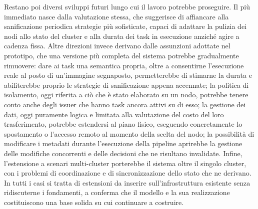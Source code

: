 Restano poi diversi sviluppi futuri lungo cui il lavoro potrebbe proseguire. Il più immediato nasce dalla valutazione stessa, che suggerisce di affiancare alla sanificazione periodica strategie più sofisticate, capaci di adattare la pulizia dei nodi allo stato del cluster e alla durata dei task in esecuzione anziché agire a cadenza fissa. Altre direzioni invece derivano dalle assunzioni adottate nel prototipo, che una versione più completa del sistema potrebbe gradualmente rimuovere: dare ai task una semantica propria, oltre a consentirne l'esecuzione reale al posto di un'immagine segnaposto, permetterebbe di stimarne la durata e abiliterebbe proprio le strategie di sanificazione appena accennate; la politica di isolamento, oggi riferita a ciò che è stato elaborato su un nodo, potrebbe tenere conto anche degli issuer che hanno task ancora attivi su di esso; la gestione dei dati, oggi puramente logica e limitata alla valutazione del costo del loro trasferimento, potrebbe estendersi al piano fisico, eseguendo concretamente lo spostamento o l'accesso remoto al momento della scelta del nodo; la possibilità di modificare i metadati durante l'esecuzione della pipeline aprirebbe la gestione delle modifiche concorrenti e delle decisioni che ne risultano invalidate. Infine, l'estensione a scenari multi-cluster porterebbe il sistema oltre il singolo cluster, con i problemi di coordinazione e di sincronizzazione dello stato che ne derivano. In tutti i casi si tratta di estensioni da inserire sull'infrastruttura esistente senza ridiscuterne i fondamenti, a conferma che il modello e la sua realizzazione costituiscono una base solida su cui continuare a costruire.
